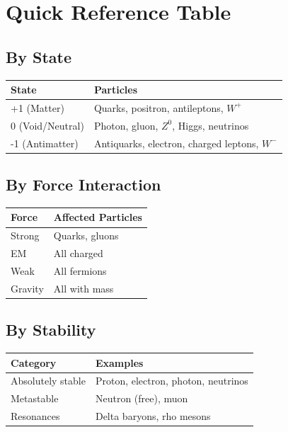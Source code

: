 \documentclass[
  11pt,
  letterpaper,
  twoside,
  openany]{book}
\makeatletter
\let\orig@section\section
\renewcommand{\section}{\needspace{8\baselineskip}\orig@section}
\let\orig@subsection\subsection
\renewcommand{\subsection}{\needspace{6\baselineskip}\orig@subsection}
\makeatother
\begin{document}
\section{Quick Reference Table}\label{quick-reference-table}

\subsection{By State}\label{by-state}

\begin{longtable}[]{@{}ll@{}}
\toprule\noalign{}
State & Particles \\
\midrule\noalign{}
\endhead
\bottomrule\noalign{}
\endlastfoot
+1 (Matter) & Quarks, positron, antileptons, \(W^+\) \\
0 (Void/Neutral) & Photon, gluon, \(Z^0\), Higgs, neutrinos \\
-1 (Antimatter) & Antiquarks, electron, charged leptons, \(W^-\) \\
\end{longtable}

\subsection{By Force Interaction}\label{by-force-interaction}

\begin{longtable}[]{@{}ll@{}}
\toprule\noalign{}
Force & Affected Particles \\
\midrule\noalign{}
\endhead
\bottomrule\noalign{}
\endlastfoot
Strong & Quarks, gluons \\
EM & All charged \\
Weak & All fermions \\
Gravity & All with mass \\
\end{longtable}

\subsection{By Stability}\label{by-stability}

\begin{longtable}[]{@{}ll@{}}
\toprule\noalign{}
Category & Examples \\
\midrule\noalign{}
\endhead
\bottomrule\noalign{}
\endlastfoot
Absolutely stable & Proton, electron, photon, neutrinos \\
Metastable & Neutron (free), muon \\
Resonances & Delta baryons, rho mesons \\
\end{longtable}
\end{document}
